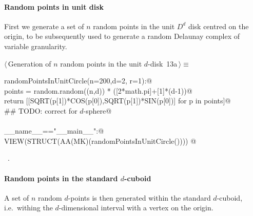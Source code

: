 \documentclass[11pt,oneside]{article}	%
\begin{document}
\paragraph{Random points in unit disk} 
First we generate a  set of $n$ random points in the unit $D^d$ disk centred on the origin, to be subsequently used to generate a random Delaunay complex of variable granularity.

\begin{flushleft} \small \label{scrap23}
\protect{}$\langle\,$Generation of $n$ random points in the unit $d$-disk\nobreak\ {\footnotesize 13a}$\,\rangle\equiv$
\vspace{-1ex}
\begin{list}{}{} \item
\mbox{}\verb@def randomPointsInUnitCircle(n=200,d=2, r=1):@\\
\mbox{}\verb@   points = random.random((n,d)) * ([2*math.pi]+[1]*(d-1))@\\
\mbox{}\verb@   return [[SQRT(p[1])*COS(p[0]),SQRT(p[1])*SIN(p[0])] for p in points]@\\
\mbox{}\verb@   ## TODO: correct for $d$-sphere@\\
\mbox{}\verb@@\\
\mbox{}\verb@if __name__=="__main__":@\\
\mbox{}\verb@   VIEW(STRUCT(AA(MK)(randomPointsInUnitCircle()))) @\\
\mbox{}\verb@@{\NWsep}
\end{list}
\vspace{-1ex}
\footnotesize\addtolength{\baselineskip}{-1ex}
\begin{list}{}{\setlength{\itemsep}{-\parsep}\setlength{\itemindent}{-\leftmargin}}
\item \NWtxtMacroRefIn\ .
\end{list}
\end{flushleft}

\paragraph{Random points in the standard $d$-cuboid} 
A set of $n$ random $d$-points is then generated within the standard $d$-cuboid, i.e.~withing the $d$-dimensional interval with a vertex on the origin.
\end{document}
